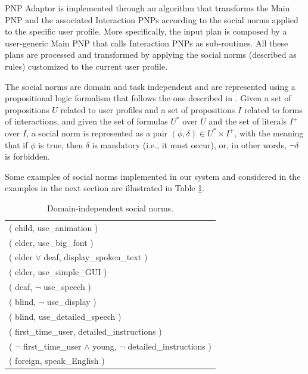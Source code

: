 PNP Adaptor is implemented through an algorithm that transforms the Main PNP and the associated Interaction PNPs according to the social norms applied to the specific user profile. More specifically, the input plan is composed by a user-generic Main PNP that calls Interaction PNPs as sub-routines. All these plans are processed and transformed by applying the social norms (described as rules) customized to the current user profile.

The social norms are domain and task independent and are represented using a propositional logic formalism that follows the one described in \cite{BoPiTo09}. 
Given a set of propositions $U$ related to user profiles and a set of propositions $I$ related to forms of interactions, and given the set of formulas $U^{*}$ over $U$ and the set of literals $I^{+}$ over $I$,
a social norm is represented as a pair $(\phi,\delta) \in U^{*} \times I^{+}$, %
with the meaning that if $\phi$ is true, then $\delta$ is mandatory (i.e., it must occur), or, in other words, $\neg \delta$ is forbidden. 

Some examples of social norms implemented in our system and considered in the examples in the next section are illustrated in Table \ref{tab:socialnorms}. 


\begin{table}
\begin{center}
\begin{tabular}{|l|} \hline
( child, use\_animation ) \\ 
( elder, use\_big\_font ) \\ 
( elder $\vee$ deaf, display\_spoken\_text ) \\ 
( elder, use\_simple\_GUI ) \\
( deaf, $\neg$ use\_speech ) \\
( blind, $\neg$ use\_display ) \\
( blind, use\_detailed\_speech ) \\
( first\_time\_user, detailed\_instructions ) \\ 
( $\neg$ first\_time\_user $\wedge$ young, $\neg$ detailed\_instructions ) \\ 
( foreign, speak\_English ) \\ 
\hline
\end{tabular}
\caption{Domain-independent social norms.}
\label{tab:socialnorms}
\end{center}
\vspace{-0.8cm}
\end{table}

